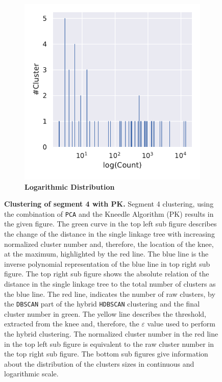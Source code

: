 \begin{figure}[!hbt]
\begin{subfigure}[b]{0.475\textwidth}
    \end{subfigure}
    \hfill
    \begin{subfigure}[b]{0.475\textwidth}
        \caption[Logarithmic Distribution]{\textbf{Logarithmic Distribution}}
        \label{subfig:PCA_Cluster_Knee_Distribution_log_4}            \includegraphics[width=\textwidth]{PCA/Cluster_Distribution_Log_Segment_4.pdf}
    \end{subfigure}
    \caption[Clustering of segment 4 with PK]{\textbf{Clustering of segment 4 with PK.} Segment 4 clustering, using the combination of \texttt{PCA} and the Kneedle Algorithm (PK) results in the given figure. The green curve in the top left sub figure describes the change of the distance in the single linkage tree with increasing normalized cluster number and, therefore, the location of the knee, at the maximum, highlighted by the red line. The blue line is the inverse polynomial representation of the blue line in top right sub figure. The top right sub figure shows the absolute relation of the distance in the single linkage tree to the total number of clusters as the blue line. The red line, indicates the number of raw clusters, by the \texttt{DBSCAN} part of the hybrid \texttt{HDBSCAN} clustering and the final cluster number in green. The yellow line describes the threshold, extracted from the knee and, therefore, the $\varepsilon$ value used to perform the hybrid clustering. The normalized cluster number in the red line in the top left sub figure is equivalent to the raw cluster number in the top right sub figure. The bottom sub figures give information about the distribution of the clusters sizes in continuous and logarithmic scale.}
    \label{fig:PCA_Cluster_Knee_4}
\end{figure}

